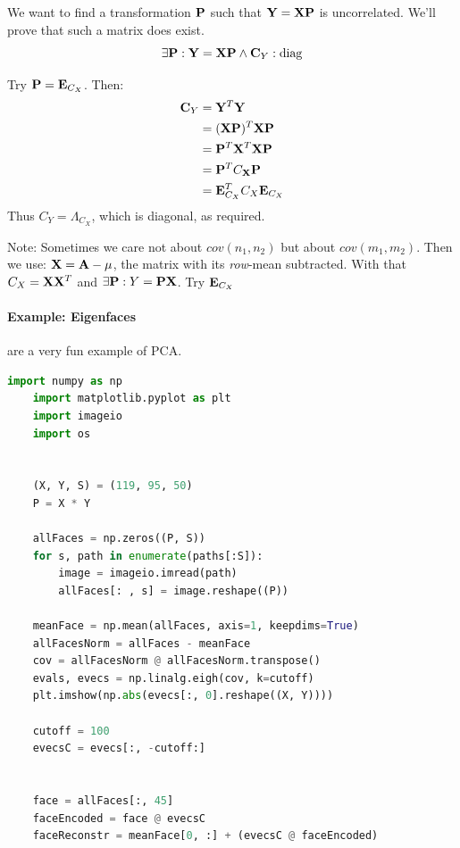 We want to find a transformation $\mathbf{P}$ such that $\mathbf{Y} = \mathbf{X} \mathbf{P}$ is uncorrelated. We'll prove that such a matrix does exist.
\begin{equation}
    \exists \mathbf{P}: \mathbf{Y} = \mathbf{X} \mathbf{P} \land \mathbf{C}_Y: \text{diag}
\end{equation}

Try $\mathbf{P} = \mathbf{E}_{C_X}$. Then:
\begin{equation}
    \begin{aligned}
        \mathbf{C}_Y  &= \mathbf{Y}^T \mathbf{Y} \\
                    &= (\mathbf{X} \mathbf{P})^T \mathbf{X} \mathbf{P} \\
                    &= \mathbf{P}^T \mathbf{X}^T \mathbf{X} \mathbf{P} \\
                    &= \mathbf{P}^T C_{\mathbf{X}} \mathbf{P} \\
                    &= \mathbf{E}_{C_X}^T C_X \mathbf{E}_{C_X}
    \end{aligned}
\end{equation}
Thus $C_Y = \Lambda_{C_X}$, which is diagonal, as required.


Note: Sometimes we care not about $cov(n_1, n_2)$ but about $cov(m_1, m_2)$. Then we use: $\mathbf{X} = \mathbf{A} - \mathbf{\mu}$, the matrix with its \emph{row}-mean subtracted. With that $C_X = \mathbf{X} \mathbf{X}^T$ and $\exists \mathbf{P}: Y = \mathbf{P}\mathbf{X}$. Try $\mathbf{E}_{C_X}$

\paragraph{Example: Eigenfaces} are a very fun example of PCA.

\begin{lstlisting}[language=python]
    import numpy as np
    import matplotlib.pyplot as plt
    import imageio
    import os
    
    
    (X, Y, S) = (119, 95, 50)
    P = X * Y
    
    allFaces = np.zeros((P, S))
    for s, path in enumerate(paths[:S]):
        image = imageio.imread(path)
        allFaces[: , s] = image.reshape((P))
    
    meanFace = np.mean(allFaces, axis=1, keepdims=True)
    allFacesNorm = allFaces - meanFace
    cov = allFacesNorm @ allFacesNorm.transpose()
    evals, evecs = np.linalg.eigh(cov, k=cutoff)
    plt.imshow(np.abs(evecs[:, 0].reshape((X, Y))))
    
    cutoff = 100
    evecsC = evecs[:, -cutoff:]


    face = allFaces[:, 45]
    faceEncoded = face @ evecsC
    faceReconstr = meanFace[0, :] + (evecsC @ faceEncoded)
\end{lstlisting}

